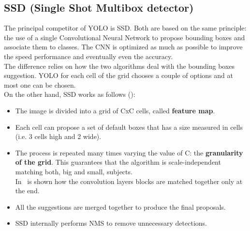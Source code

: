 \subsection{SSD (Single Shot Multibox detector)} \label{sec:ssd}
The principal competitor of YOLO is SSD\cite{ssd}. Both are based on the same principle: the use of a single Convolutional Neural Network to propose bounding boxes and associate them to classes. The CNN is optimized as much as possible to improve the speed performance and eventually even the accuracy.\\
The difference relies on how the two algorithms deal with the bounding boxes suggestion. YOLO for each cell of the grid chooses a couple of options and at most one can be chosen.\\
On the other hand, SSD works as follows ():
\begin{itemize}
	\item The image is divided into a grid of CxC cells, called \textbf{feature map}.
	\item Each cell can propose a set of default boxes that has a size measured in cells (i.e. 3 cells high and 2 wide).
	\item The process is repeated many times varying the value of C: the \textbf{granularity of the grid}. This guarantees that the algorithm is scale-independent matching both, big and small, subjects.\\
	In~ is shown how the convolution layers blocks are matched together only at the end.
	\item All the suggestions are merged together to produce the final proposals.
	\item SSD internally performs NMS to remove unnecessary detections.
\end{itemize}

